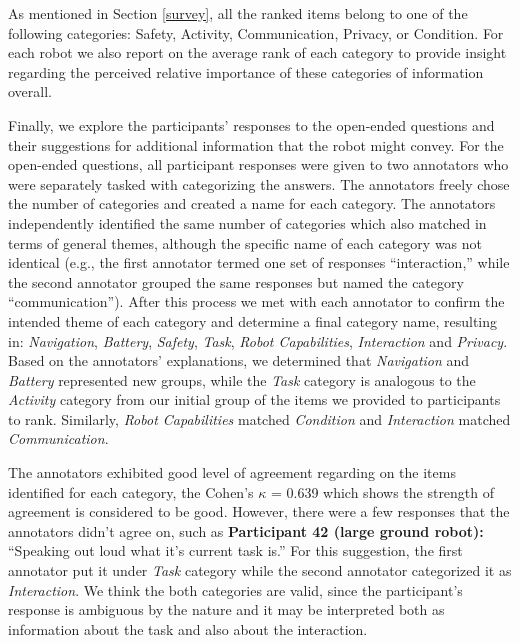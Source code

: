 \documentclass[letterpaper, 10 pt, conference]{ieeeconf}  %
\newcommand\hooman[1]{\textcolor{red}{HoOman--#1}}
\begin{document}
As mentioned in Section \ref{survey}, all the ranked items belong to one of the following categories: Safety, Activity, Communication, Privacy, or Condition. For each robot we also report on the average rank of each category to provide insight regarding the perceived relative importance of these categories of information overall. 

Finally, we explore the participants' responses to the open-ended questions and their suggestions for additional information that the robot might convey. For the open-ended questions, all participant responses were given to two annotators who were separately tasked with categorizing the answers. The annotators freely chose the number of categories and created a name for each category. The annotators independently identified the same number of categories which also matched in terms of general themes, although the specific name of each category was not identical (e.g., the first annotator termed one set of responses ``interaction,'' while the second annotator grouped the same responses but named the category ``communication''). After this process we met with each annotator to confirm the intended theme of each category and determine a final category name, resulting in: \textit{Navigation}, \textit{Battery}, \textit{Safety}, \textit{Task}, \textit{Robot Capabilities}, \textit{Interaction} and \textit{Privacy}. Based on the annotators' explanations, we determined that \textit{Navigation} and \textit{Battery} represented new groups, while the \textit{Task} category is analogous to the \textit{Activity} category from our initial group of the items we provided to participants to rank. Similarly, \textit{Robot Capabilities} matched \textit{Condition} and \textit{Interaction} matched \textit{Communication}. 

The annotators exhibited good level of agreement regarding on the items identified for each category, the Cohen's $\kappa$ = 0.639 which shows the strength of agreement is considered to be good. However, there were a few responses that the annotators didn't agree on, such as \textbf{Participant 42 (large ground robot):} ``Speaking out loud what it's current task is.'' For this suggestion, the first annotator put it under \textit{Task} category while the second annotator categorized it as \textit{Interaction}. We think the both categories are valid, since the participant's response is ambiguous by the nature and it may be interpreted both as information about the task and also about the interaction. %
\end{document}
